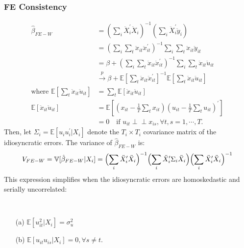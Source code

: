 \subsubsection{FE Consistency}
\begin{align*}
    \hat{\beta}_{FE-W} &= \left( \sum_{i} \ddot{X}_i^{\prime} \ddot{X}_i \right)^{-1} \left( \sum_{i} \ddot{X}_i^{\prime} \ddot{y}_i \right) \\
    &= \left(\sum_i \sum_t \ddot{x}_{it} \ddot{x}_{it}^{\prime} \right)^{-1} \sum_i \sum_t \ddot{x}_{it} \ddot{y}_{it} \\
    &= \beta + \left(\sum_i \sum_t \ddot{x}_{it} \ddot{x}_{it}^{\prime} \right)^{-1} \sum_i \sum_t \ddot{x}_{it} \ddot{u}_{it} \\
    &\overset{p}{\rightarrow} \beta + \mathbb{E}\left[\sum_t \ddot{x}_{it} \ddot{x}_{it}^{\prime} \right]^{-1} \mathbb{E}\left[\sum_t \ddot{x}_{it} \ddot{u}_{it} \right] \\
    \text{where } \mathbb{E}\left[\sum_t \ddot{x}_{it} \ddot{u}_{it}\right] &= \sum_t \mathbb{E}\left[\ddot{x}_{it} \ddot{u}_{it} \right]\\
    \mathbb{E}\left[\ddot{x}_{it} \ddot{u}_{it} \right] &= \mathbb{E}\left[\left(x_{it} - \frac{1}{T}\sum_t x_{it} \right) \left(u_{it} - \frac{1}{T}\sum_t u_{it} \right)^{\prime} \right] \\
    &= 0 \quad \text{if } u_{it} \perp\!\!\!\perp x_{is}, \forall t, s = 1, \cdots, T.
\end{align*}
Then, let $\Sigma_i = \mathbb{E}[u_i u_i^{\prime} | X_i]$ denote the $T_i \times T_i$ covariance matrix of the idiosyncratic errors.
The variance of $\hat{\beta}_{FE-W}$ is:
\begin{gather*}
    V_{FE-W} = \mathbb{V}[\hat{\beta}_{FE-W} | X_i] = \Bigl( \sum_{i} \ddot{X}_i^{\prime} \ddot{X}_i \Bigr)^{-1} \Bigl( \sum_{i} \ddot{X}_i^{\prime} \Sigma_i \ddot{X}_i \Bigr) \Bigl( \sum_{i} \ddot{X}_i^{\prime} \ddot{X}_i \Bigr)^{-1} 
\end{gather*}
This expression simplifies when the idiosyncratic errors are homoskedastic and serially uncorrelated:
\begin{assumption}\label{FE-homoskedasticity}
    \

    \begin{enumerate}
        \item[(a)] $\mathbb{E}[u_{it}^2 | X_i] = \sigma_u^2$ 
        \item[(b)] $\mathbb{E}[u_{it} u_{is} | X_i] = 0, \forall s \neq t.$
    \end{enumerate}
\end{assumption}

